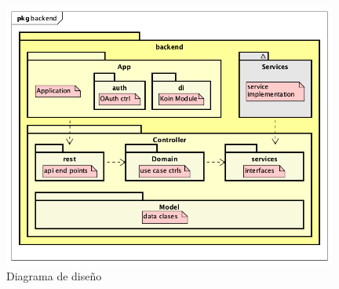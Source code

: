     \begin{figure}[H]
    \centering
        \includegraphics[width=11cm]{./img/arch/back/diagram.design.png}
        \caption{Diagrama de diseño}
        \label{fig:designdiagram}
    \end{figure}

